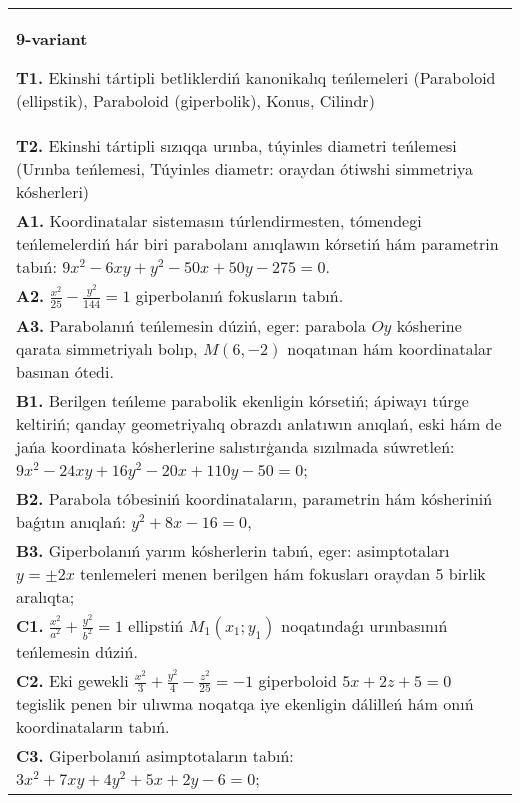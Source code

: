 \documentclass{article}
\begin{document}
\begin{tabular}{m{17cm}}
\textbf{9-variant}
\newline

\textbf{T1.} Ekinshi tártipli betliklerdiń kanonikalıq teńlemeleri (Paraboloid (ellipstik), Paraboloid (giperbolik), Konus, Cilindr) \\
\textbf{T2.} Ekinshi tártipli sızıqqa urınba, túyinles diametri teńlemesi (Urınba teńlemesi, Túyinles diametr: oraydan ótiwshi simmetriya kósherleri) \\
\textbf{A1.} Koordinatalar sistemasın túrlendirmesten, tómendegi teńlemelerdiń hár biri parabolanı anıqlawın kórsetiń hám parametrin tabıń: $9 x^2-6 x y+y^2-50 x+50 y-275=0$. \\
\textbf{A2.} $\frac{x^2}{25}-\frac{y^2}{144}=1$ giperbolanıń fokusların tabıń. \\
\textbf{A3.} Parabolanıń teńlemesin dúziń, eger: parabola $O y$ kósherine qarata simmetriyalı bolıp, $M (6,-2) $ noqatınan hám koordinatalar basınan ótedi. \\
\textbf{B1.} Berilgen teńleme parabolik ekenligin kórsetiń; ápiwayı túrge keltiriń; qanday geometriyalıq obrazdı anlatıwın anıqlań, eski hám de jańa koordinata kósherlerine salıstırģanda sızılmada súwretleń:$9 x^2-24 x y+16 y^2-20 x+110 y-50=0$; \\
\textbf{B2.} Parabola tóbesiniń koordinataların, parametrin hám kósheriniń baǵıtın anıqlań: $y^2+8 x-16=0$, \\
\textbf{B3.} Giperbolanıń yarım kósherlerin tabıń, eger: asimptotaları $y= \pm 2 x$ tenlemeleri menen berilgen hám fokusları oraydan 5 birlik aralıqta; \\
\textbf{C1.} $\frac{x^2}{a^2}+\frac{y^2}{b^2}=1$ ellipstiń $M_1 (x_1; y_1) $ noqatındaǵı urınbasınıń teńlemesin dúziń. \\
\textbf{C2.} Eki gewekli $\frac{x^2}{3}+\frac{y^2}{4}-\frac{z^2}{25}=-1$ giperboloid $5 x+2 z+5=0$ tegislik penen bir ulıwma noqatqa iye ekenligin dálilleń hám onıń koordinataların tabıń. \\
\textbf{C3.} Giperbolanıń asimptotaların tabıń: $3 x^2+7 x y+4 y^2+5 x+2 y-6=0$; \\

\end{tabular}
\vspace{1cm}
\end{document}
